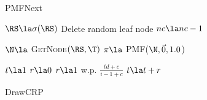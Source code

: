 \begin{figure*}[ttt!]
	\begin{minipage}[t]{.48\linewidth}
		\begin{algorithm}[H]
			\caption{PMFNext} \label{alg:pmfnextsymbol}
	\begin{algorithmic}[1]
			\State $\RS \la \sigma(\RS)$
		\EndWhile
			\State Delete random leaf node
			\State $nc \la nc -1$
		\EndWhile
		
		\State $\N \la$ \textsc{GetNode}$(\RS, \T)$
		\State $\pi \la$ \textsc{PMF}($\N, \vec 0, 1.0$) 
	\EndFunction
	 \end{algorithmic}
\end{algorithm}
\vspace{-.75cm}
\begin{algorithm}[H]
	\caption{DrawCRP} \label{alg:drawcrp}
	\begin{algorithmic}[1]

		\State $t \la 1$
			\State $r \la 0$
			\State $r  \la 1$ w.p. $\frac{td + c}{i-1 + c}$
			\State $t \la t + r$
		\EndFor
	\EndFunction
	

\end{algorithmic}
\end{algorithm}
\end{minipage}
\end{figure*}
